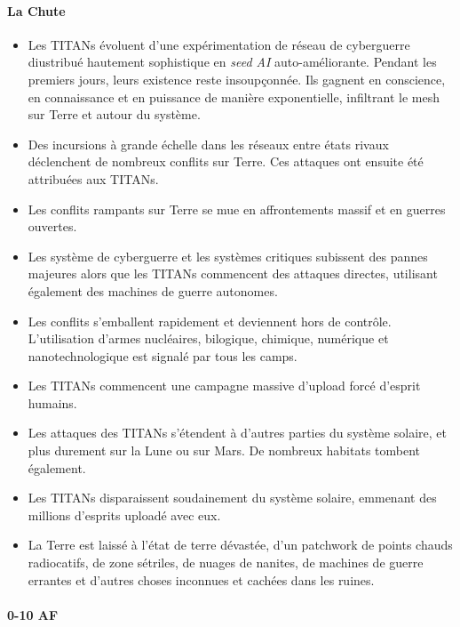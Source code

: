 \documentclass[a4paper,9pt]{article}
\begin{document}
\begin{multicols}{3}
\paragraph{La Chute} 

\begin{itemize} 
   \item Les TITANs évoluent d'une expérimentation de réseau de cyberguerre
      diustribué hautement sophistique en \textit{seed AI} auto-améliorante.
      Pendant les premiers jours, leurs existence reste insoupçonnée. Ils
      gagnent en conscience, en connaissance et en puissance de manière
      exponentielle, infiltrant le  mesh sur Terre et autour du système. 
   \item Des incursions à grande échelle dans les réseaux entre états rivaux
      déclenchent de nombreux conflits sur Terre. Ces attaques ont ensuite été
      attribuées aux TITANs. 
   \item Les conflits rampants sur Terre se mue en affrontements massif et en
      guerres ouvertes. 
   \item Les système de cyberguerre et les systèmes critiques subissent des
      pannes majeures alors que les TITANs commencent des attaques directes,
      utilisant également des machines de guerre autonomes. 
   \item Les conflits s'emballent rapidement et deviennent hors de contrôle.
      L'utilisation d'armes nucléaires, bilogique, chimique, numérique et
      nanotechnologique est signalé par tous les camps. 
   \item Les TITANs commencent une campagne massive d'upload forcé d'esprit
      humains. 
   \item Les attaques des TITANs s'étendent à d'autres parties du système
      solaire, et plus durement sur la Lune ou sur Mars. De nombreux habitats
      tombent également. 
   \item Les TITANs disparaissent soudainement du système solaire, emmenant des
      millions d'esprits uploadé avec eux. 
   \item La Terre est laissé à l'état de terre dévastée, d'un patchwork de
      points chauds radiocatifs, de zone sétriles, de nuages de nanites, de
      machines de guerre errantes et d'autres choses inconnues et cachées dans
      les ruines.
\end{itemize} 

\paragraph{0-10 AF} 


\end{multicols}
\end{document}
